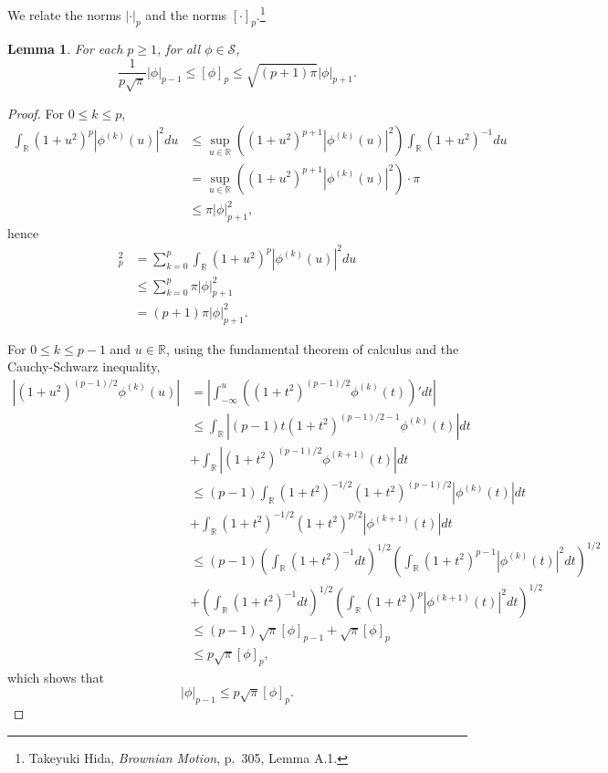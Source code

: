 \documentclass{article}
\newtheorem{lemma}[theorem]{Lemma}
\theoremstyle{definition}
\begin{document}
We relate the norms $|\cdot|_p$ and the norms $[\cdot]_p$.\footnote{Takeyuki Hida,
{\em Brownian Motion}, p.~305, Lemma A.1.}

\begin{lemma}
For each $p \geq 1$, for all
$\phi \in \mathscr{S}$,
\[
\frac{1}{p\sqrt{\pi}} |\phi|_{p-1} \leq [\phi]_p \leq  \sqrt{(p+1)\pi} |\phi|_{p+1}.
\]
\label{L2equiv}
\end{lemma}
\begin{proof}
For $0 \leq k \leq p$,
\begin{align*}
\int_{\mathbb{R}} (1+u^2)^p |\phi^{(k)}(u)|^2 du &\leq \sup_{u \in \mathbb{R}} ((1+u^2)^{p+1} |\phi^{(k)}(u)|^2) 
\int_{\mathbb{R}} (1+u^2)^{-1} du\\
&=  \sup_{u \in \mathbb{R}} ((1+u^2)^{p+1} |\phi^{(k)}(u)|^2)  \cdot \pi\\
&\leq \pi |\phi|_{p+1}^2,
\end{align*}
hence
\begin{align*}
[\phi]_p^2&=  \sum_{k=0}^p \int_{\mathbb{R}} (1+u^2)^p |\phi^{(k)}(u)|^2 du\\
&\leq \sum_{k=0}^p \pi |\phi|_{p+1}^2\\
&=(p+1)\pi  |\phi|_{p+1}^2.
\end{align*}


For $0 \leq k \leq p-1$ and $u \in \mathbb{R}$, using the fundamental theorem of calculus and the Cauchy-Schwarz inequality,
\begin{align*}
|(1+u^2)^{(p-1)/2}\phi^{(k)}(u)|&=\left| \int_{-\infty}^u ((1+t^2)^{(p-1)/2} \phi^{(k)}(t))' dt\right|\\
&\leq \int_{\mathbb{R}} |(p-1)t (1+t^2)^{(p-1)/2-1} \phi^{(k)}(t)| dt\\
&+\int_{\mathbb{R}} |(1+t^2)^{(p-1)/2} \phi^{(k+1)}(t)| dt\\
&\leq (p-1) \int_{\mathbb{R}} (1+t^2)^{-1/2} (1+t^2)^{(p-1)/2} |\phi^{(k)}(t)| dt\\
&+\int_{\mathbb{R}} (1+t^2)^{-1/2} (1+t^2)^{p/2} |\phi^{(k+1)}(t)| dt\\
&\leq (p-1) \left(\int_{\mathbb{R}} (1+t^2)^{-1} dt \right)^{1/2} \left( \int_{\mathbb{R}} (1+t^2)^{p-1} |\phi^{(k)}(t)|^2 dt\right)^{1/2}\\
&+\left(\int_{\mathbb{R}} (1+t^2)^{-1} dt\right)^{1/2} \left(\int_{\mathbb{R}} (1+t^2)^p |\phi^{(k+1)}(t)|^2 dt \right)^{1/2}\\
&\leq (p-1)\sqrt{\pi} [\phi]_{p-1} + \sqrt{\pi} [\phi]_p\\
&\leq p\sqrt{\pi} [\phi]_p,
\end{align*}
which shows that
\[
|\phi|_{p-1} \leq p\sqrt{\pi} [\phi]_p.
\]
\end{proof}
\end{document}
